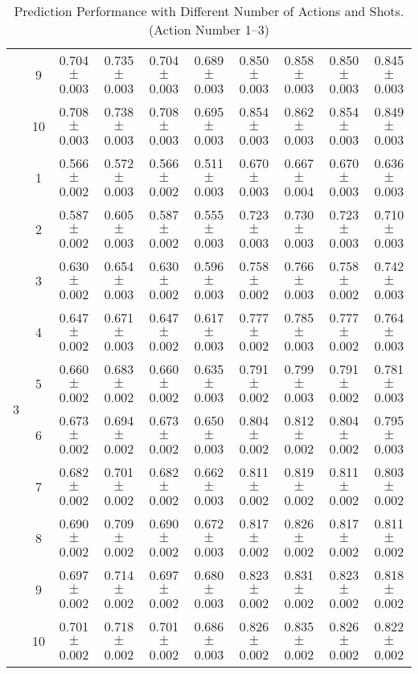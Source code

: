 \begin{table}[htbp]
{\begin{tabular}[]{c|c|cccc|cccc}
  & 9  & 0.704{\tiny$\pm$0.003} & 0.735{\tiny$\pm$0.003} & 0.704{\tiny$\pm$0.003} & 0.689{\tiny$\pm$0.003} & 0.850{\tiny$\pm$0.003} & 0.858{\tiny$\pm$0.003} & 0.850{\tiny$\pm$0.003} & 0.845{\tiny$\pm$0.003} \\
  & 10 & 0.708{\tiny$\pm$0.003} & 0.738{\tiny$\pm$0.003} & 0.708{\tiny$\pm$0.003} & 0.695{\tiny$\pm$0.003} & 0.854{\tiny$\pm$0.003} & 0.862{\tiny$\pm$0.003} & 0.854{\tiny$\pm$0.003} & 0.849{\tiny$\pm$0.003} \\
\midrule
\multirow{10}{*}{3} 
  & 1  & 0.566{\tiny$\pm$0.002} & 0.572{\tiny$\pm$0.003} & 0.566{\tiny$\pm$0.002} & 0.511{\tiny$\pm$0.003} & 0.670{\tiny$\pm$0.003} & 0.667{\tiny$\pm$0.004} & 0.670{\tiny$\pm$0.003} & 0.636{\tiny$\pm$0.003} \\
  & 2  & 0.587{\tiny$\pm$0.002} & 0.605{\tiny$\pm$0.003} & 0.587{\tiny$\pm$0.002} & 0.555{\tiny$\pm$0.003} & 0.723{\tiny$\pm$0.003} & 0.730{\tiny$\pm$0.003} & 0.723{\tiny$\pm$0.003} & 0.710{\tiny$\pm$0.003} \\
  & 3  & 0.630{\tiny$\pm$0.002} & 0.654{\tiny$\pm$0.003} & 0.630{\tiny$\pm$0.002} & 0.596{\tiny$\pm$0.003} & 0.758{\tiny$\pm$0.002} & 0.766{\tiny$\pm$0.003} & 0.758{\tiny$\pm$0.002} & 0.742{\tiny$\pm$0.003} \\
  & 4  & 0.647{\tiny$\pm$0.002} & 0.671{\tiny$\pm$0.003} & 0.647{\tiny$\pm$0.002} & 0.617{\tiny$\pm$0.003} & 0.777{\tiny$\pm$0.002} & 0.785{\tiny$\pm$0.003} & 0.777{\tiny$\pm$0.002} & 0.764{\tiny$\pm$0.003} \\
  & 5  & 0.660{\tiny$\pm$0.002} & 0.683{\tiny$\pm$0.002} & 0.660{\tiny$\pm$0.002} & 0.635{\tiny$\pm$0.003} & 0.791{\tiny$\pm$0.002} & 0.799{\tiny$\pm$0.003} & 0.791{\tiny$\pm$0.002} & 0.781{\tiny$\pm$0.003} \\
  & 6  & 0.673{\tiny$\pm$0.002} & 0.694{\tiny$\pm$0.002} & 0.673{\tiny$\pm$0.002} & 0.650{\tiny$\pm$0.003} & 0.804{\tiny$\pm$0.002} & 0.812{\tiny$\pm$0.002} & 0.804{\tiny$\pm$0.002} & 0.795{\tiny$\pm$0.003} \\
  & 7  & 0.682{\tiny$\pm$0.002} & 0.701{\tiny$\pm$0.002} & 0.682{\tiny$\pm$0.002} & 0.662{\tiny$\pm$0.003} & 0.811{\tiny$\pm$0.002} & 0.819{\tiny$\pm$0.002} & 0.811{\tiny$\pm$0.002} & 0.803{\tiny$\pm$0.002} \\
  & 8  & 0.690{\tiny$\pm$0.002} & 0.709{\tiny$\pm$0.002} & 0.690{\tiny$\pm$0.002} & 0.672{\tiny$\pm$0.003} & 0.817{\tiny$\pm$0.002} & 0.826{\tiny$\pm$0.002} & 0.817{\tiny$\pm$0.002} & 0.811{\tiny$\pm$0.002} \\
  & 9  & 0.697{\tiny$\pm$0.002} & 0.714{\tiny$\pm$0.002} & 0.697{\tiny$\pm$0.002} & 0.680{\tiny$\pm$0.003} & 0.823{\tiny$\pm$0.002} & 0.831{\tiny$\pm$0.002} & 0.823{\tiny$\pm$0.002} & 0.818{\tiny$\pm$0.002} \\
  & 10 & 0.701{\tiny$\pm$0.002} & 0.718{\tiny$\pm$0.002} & 0.701{\tiny$\pm$0.002} & 0.686{\tiny$\pm$0.003} & 0.826{\tiny$\pm$0.002} & 0.835{\tiny$\pm$0.002} & 0.826{\tiny$\pm$0.002} & 0.822{\tiny$\pm$0.002} \\
\bottomrule
\end{tabular}
}
\caption{Prediction Performance with Different Number of Actions and Shots. (Action Number 1--3)}
\end{table}

